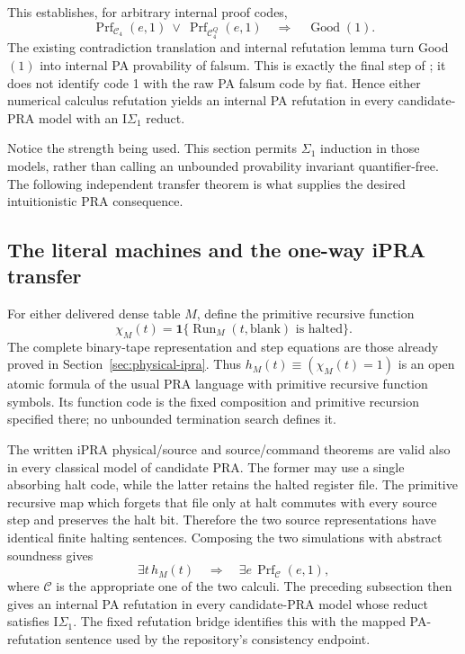 This establishes, for arbitrary internal proof codes,
\[
 \operatorname{Prf}_{\mathcal C_4}(e,1)
 \ \lor\ \operatorname{Prf}_{\mathcal C_4^Q}(e,1)
 \quad\Longrightarrow\quad \operatorname{Good}(1).
\]
The existing contradiction translation and internal refutation lemma
turn Good$(1)$ into internal PA provability of falsum.  This is exactly
the final step of ;
it does not identify code 1 with the raw PA falsum code by fiat.
Hence either numerical calculus refutation yields an internal PA
refutation in every candidate-PRA model with an $\mathrm I\Sigma_1$
reduct\cite{reverse-source}.

Notice the strength being used.  This section permits $\Sigma_1$
induction in those models, rather than calling an unbounded provability
invariant quantifier-free.  The following independent transfer theorem
is what supplies the desired intuitionistic PRA consequence.

\subsection{The literal machines and the one-way iPRA transfer}

For either delivered dense table $M$, define the primitive recursive
function
\[
 \chi_M(t)=\mathbf 1\{\operatorname{Run}_M(t,\mathrm{blank})
                         \text{ is halted}\}.
\]
The complete binary-tape representation and step equations are those
already proved in Section~\ref{sec:physical-ipra}.  Thus
$h_M(t)\equiv(\chi_M(t)=1)$ is an open atomic formula of the usual PRA
language with primitive recursive function symbols.  Its function code
is the fixed composition and primitive recursion specified there;
no unbounded termination search defines it.

The written iPRA physical/source and source/command theorems are valid
also in every classical model of candidate PRA.  The former may use a
single absorbing halt code, while the latter retains the halted register
file.  The primitive recursive map which forgets that file only at halt
commutes with every source step and preserves the halt bit.  Therefore
the two source representations have identical finite halting sentences.
Composing the two simulations with abstract soundness gives
\[
 \exists t\,h_M(t)\quad\Longrightarrow\quad
 \exists e\,\operatorname{Prf}_{\mathcal C}(e,1),
\]
where $\mathcal C$ is the appropriate one of the two calculi.
The preceding subsection then gives an internal PA refutation in every
candidate-PRA model whose reduct satisfies $\mathrm I\Sigma_1$.
The fixed refutation bridge identifies this with the mapped PA-refutation
sentence used by the repository's consistency endpoint.

